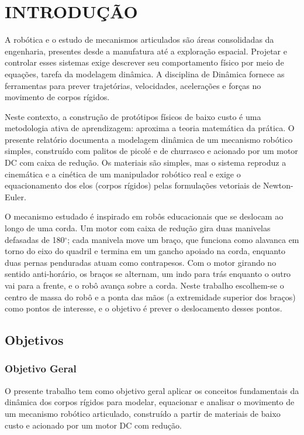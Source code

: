 \chapter{INTRODUÇÃO}
\label{chapter:introducao}

A robótica e o estudo de mecanismos articulados são áreas consolidadas da engenharia, presentes desde a manufatura até a exploração espacial. Projetar e controlar esses sistemas exige descrever seu comportamento físico por meio de equações, tarefa da modelagem dinâmica. A disciplina de Dinâmica fornece as ferramentas para prever trajetórias, velocidades, acelerações e forças no movimento de corpos rígidos.

Neste contexto, a construção de protótipos físicos de baixo custo é uma metodologia ativa de aprendizagem: aproxima a teoria matemática da prática. O presente relatório documenta a modelagem dinâmica de um mecanismo robótico simples, construído com palitos de picolé e de churrasco e acionado por um motor DC com caixa de redução. Os materiais são simples, mas o sistema reproduz a cinemática e a cinética de um manipulador robótico real e exige o equacionamento dos elos (corpos rígidos) pelas formulações vetoriais de Newton-Euler.

O mecanismo estudado é inspirado em robôs educacionais que se deslocam ao longo de uma corda. Um motor com caixa de redução gira duas manivelas defasadas de 180$^\circ$; cada manivela move um braço, que funciona como alavanca em torno do eixo do quadril e termina em um gancho apoiado na corda, enquanto duas pernas penduradas atuam como contrapesos. Com o motor girando no sentido anti-horário, os braços se alternam, um indo para trás enquanto o outro vai para a frente, e o robô avança sobre a corda. Neste trabalho escolhem-se o centro de massa do robô e a ponta das mãos (a extremidade superior dos braços) como pontos de interesse, e o objetivo é prever o deslocamento desses pontos.

\section{Objetivos}

\subsection{Objetivo Geral}
O presente trabalho tem como objetivo geral aplicar os conceitos fundamentais da dinâmica dos corpos rígidos para modelar, equacionar e analisar o movimento de um mecanismo robótico articulado, construído a partir de materiais de baixo custo e acionado por um motor DC com redução.

